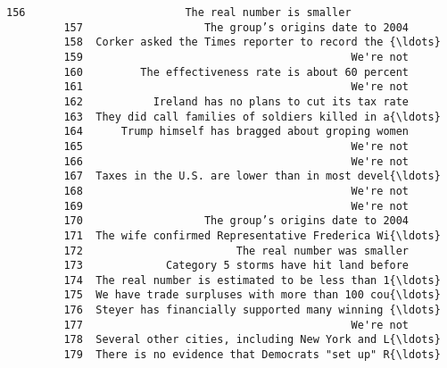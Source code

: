 \documentclass[11pt]{article}
\begin{document}
\begin{Verbatim}[commandchars=\\\{\}]
         156                         The real number is smaller   
         157                   The group’s origins date to 2004   
         158  Corker asked the Times reporter to record the {\ldots}   
         159                                          We're not   
         160         The effectiveness rate is about 60 percent   
         161                                          We're not   
         162           Ireland has no plans to cut its tax rate   
         163  They did call families of soldiers killed in a{\ldots}   
         164      Trump himself has bragged about groping women   
         165                                          We're not   
         166                                          We're not   
         167  Taxes in the U.S. are lower than in most devel{\ldots}   
         168                                          We're not   
         169                                          We're not   
         170                   The group’s origins date to 2004   
         171  The wife confirmed Representative Frederica Wi{\ldots}   
         172                        The real number was smaller   
         173             Category 5 storms have hit land before   
         174  The real number is estimated to be less than 1{\ldots}   
         175  We have trade surpluses with more than 100 cou{\ldots}   
         176  Steyer has financially supported many winning {\ldots}   
         177                                          We're not   
         178  Several other cities, including New York and L{\ldots}   
         179  There is no evidence that Democrats "set up" R{\ldots}   
         

\end{Verbatim}
\end{document}
